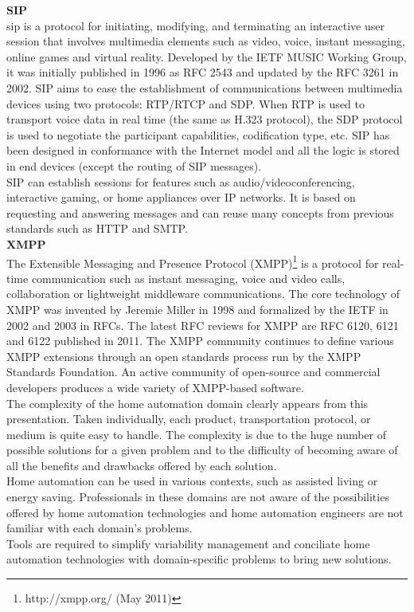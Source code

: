 {\bf SIP}\\
\gls{sip} is a protocol for initiating, modifying, and terminating an interactive user session that involves multimedia elements such as video, voice, instant messaging, online games and virtual reality. Developed by the IETF MUSIC Working Group, it was initially published in 1996 as RFC 2543 and updated by the RFC 3261 in 2002.
SIP aims to ease the establishment of communications between multimedia devices using two protocols: RTP/RTCP and SDP.
When RTP is used to transport voice data in real time (the same as H.323 protocol), the SDP protocol is used to negotiate the participant capabilities, codification type, etc.
SIP has been designed in conformance with the Internet model and all the logic is stored in end devices (except the routing of SIP messages).\\
SIP can establish sessions for features such as audio/videoconferencing, interactive gaming, or home appliances over IP networks. It is based on requesting and answering messages and can reuse many concepts from previous standards such as HTTP and SMTP.\\


{\bf XMPP}\\
The Extensible Messaging and Presence Protocol (XMPP)\footnote{http://xmpp.org/ (May 2011)} is a protocol for real-time communication such as instant messaging, voice and video calls, collaboration or lightweight middleware communications.
The core technology of XMPP was invented by Jeremie Miller in 1998 and formalized by the IETF in 2002 and 2003 in RFCs. The latest RFC reviews for XMPP are RFC 6120, 6121 and 6122 published in 2011. The XMPP community continues to define various XMPP extensions through an open standards process run by the XMPP Standards Foundation. An active community of open-source and commercial developers produces a wide variety of XMPP-based software.\\

The complexity of the home automation domain clearly appears from this presentation. Taken individually, each product, transportation protocol, or medium is quite easy to handle. The complexity is due to the huge number of possible solutions for a given problem and to the difficulty of becoming aware of all the benefits and drawbacks offered by each solution.\\
Home automation can be used in various contexts, such as assisted living or energy saving. Professionals in these domains are not aware of the possibilities offered by home automation technologies and home automation engineers are not familiar with each domain's problems.\\
Tools are required to simplify variability management and conciliate home automation technologies with domain-specific problems to bring new solutions.


